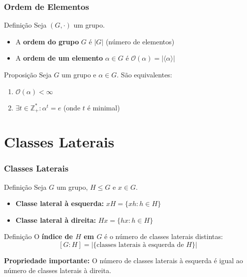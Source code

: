 \documentclass{beamer}
\begin{document}
\begin{frame}
\frametitle{Ordem de Elementos}

\begin{block}{Definição}
Seja $(G, \cdot)$ um grupo.
\begin{itemize}
\item A \textbf{ordem do grupo} $G$ é $|G|$ (número de elementos)
\item A \textbf{ordem de um elemento} $\alpha \in G$ é $\mathcal{O}(\alpha) = |\langle \alpha \rangle|$
\end{itemize}
\end{block}

\pause

\begin{exampleblock}{Proposição}
Seja $G$ um grupo e $\alpha \in G$. São equivalentes:
\begin{enumerate}
\item $\mathcal{O}(\alpha) < \infty$
\item $\exists t \in \mathbb{Z}^*_+ : \alpha^t = e$ (onde $t$ é minimal)
\end{enumerate}
\end{exampleblock}

\end{frame}

\section{Classes Laterais}

\begin{frame}
\frametitle{Classes Laterais}

\begin{block}{Definição}
Seja $G$ um grupo, $H \leq G$ e $x \in G$.
\begin{itemize}
\item \textbf{Classe lateral à esquerda:} $xH = \{xh : h \in H\}$
\item \textbf{Classe lateral à direita:} $Hx = \{hx : h \in H\}$
\end{itemize}
\end{block}

\pause

\begin{block}{Definição}
O \textbf{índice de $H$ em $G$} é o número de classes laterais distintas:
\[
[G:H] = |\{\text{classes laterais à esquerda de } H\}|
\]
\end{block}

\pause

\textbf{Propriedade importante:} O número de classes laterais à esquerda é igual ao número de classes laterais à direita.

\end{frame}
\end{document}
